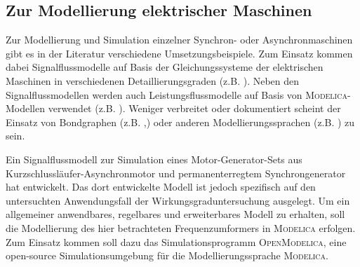 \subsection{Zur Modellierung elektrischer Maschinen}
\label{subsec:ModellierungElektrischerMaschinen}
Zur Modellierung und Simulation einzelner Synchron- oder Asynchronmaschinen gibt es in der Literatur verschiedene Umsetzungsbeispiele. Zum Einsatz kommen dabei Signalflussmodelle auf Basis der Gleichungssysteme der elektrischen Maschinen in verschiedenen Detaillierungsgraden (z.B. \cites{kutznerModellierungUndSimulation2010a,alibrahimSimulationsmodellDoppeltGespeisten2017,razakModellingSimulationElectric2021}). Neben den Signalflussmodellen werden auch Leistungsflussmodelle auf Basis von \textsc{Modelica}-Modellen verwendet (z.B. \cites{calisModelicaSimulationFeldorientiertGeregelten,frankeMultidisziplinareModellierungUnd2012,}). Weniger verbreitet oder dokumentiert scheint der Einsatz von Bondgraphen (z.B. \cite{sahmTwoaxisBondGraph1979},\cite[S.~269-321]{borutzkyBondGraphModelling2011}) oder anderen Modellierungssprachen (z.B. \cite{justusDynamischesVerhaltenElektrischer1993}) zu sein. 

Ein Signalflussmodell zur Simulation eines Motor-Generator-Sets aus Kurzschlussläufer-Asynchronmotor und permanenterregtem Synchrongenerator hat \cite{razakModellingSimulationElectric2021} entwickelt. Das dort entwickelte Modell ist jedoch spezifisch auf den untersuchten Anwendungsfall der Wirkungsgraduntersuchung ausgelegt. Um ein allgemeiner anwendbares, regelbares und erweiterbares Modell zu erhalten, soll die Modellierung des hier betrachteten Frequenzumformers in \textsc{Modelica} erfolgen. Zum Einsatz kommen soll dazu das Simulationsprogramm \textsc{OpenModelica}, eine open-source Simulationsumgebung für die Modellierungssprache \textsc{Modelica}.












